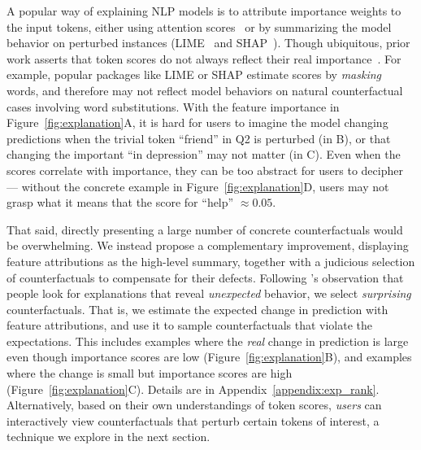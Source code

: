 



A popular way of explaining NLP models is to attribute importance weights to the input tokens, either using attention scores~\cite{wiegreffe2019attention} or by summarizing the model behavior on perturbed instances (\eg LIME~\cite{Ribeiro2016WhySI} and SHAP~\cite{NIPS2017_7062}).
Though ubiquitous, prior work asserts that token scores do not always reflect their real importance~\cite{pruthi2020learning}.
For example, popular packages like LIME or SHAP estimate scores by \emph{masking} words, and therefore may not reflect model behaviors on natural counterfactual cases involving \eg word substitutions.
With the feature importance in Figure~\ref{fig:explanation}A, it is hard for users to imagine the model changing predictions when the trivial token ``friend'' in Q2 is perturbed (in B), or that changing the important ``in depression'' may not matter (in C).
Even when the scores correlate with importance, they can be too abstract for users to decipher~\cite{miller} --- without the concrete example in Figure~\ref{fig:explanation}D, users may not grasp what it means that the score for ``help'' ${\approx}0.05$. 




That said, directly presenting a large number of concrete counterfactuals would be overwhelming.
We instead propose a complementary improvement, displaying feature attributions as the high-level summary, together with a judicious selection of \sysname counterfactuals to compensate for their defects.
Following \citet{miller}'s observation that people look for explanations that reveal \emph{unexpected} behavior, we select \emph{surprising} counterfactuals.
That is, we estimate the expected change in prediction with feature attributions, and use it to sample counterfactuals that violate the expectations.
This includes examples where the \emph{real} change in prediction is large even though importance scores are low (Figure~\ref{fig:explanation}B), and examples where the change is small but importance scores are high (Figure~\ref{fig:explanation}C).
Details are in Appendix~\ref{appendix:exp_rank}. 
Alternatively, based on their own understandings of token scores, \emph{users} can interactively view counterfactuals that perturb certain tokens of interest, a technique we explore in the next section. 


